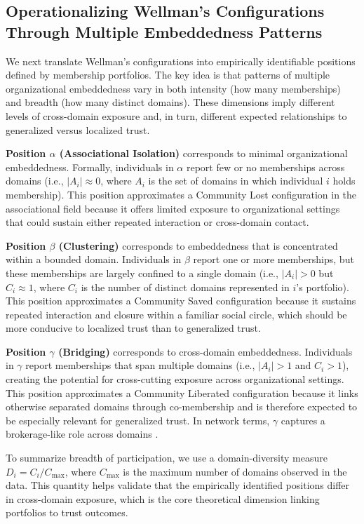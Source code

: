 \subsection{Operationalizing Wellman's Configurations Through Multiple Embeddedness Patterns}

We next translate Wellman's configurations into empirically identifiable positions defined by membership portfolios. The key idea is that patterns of multiple organizational embeddedness vary in both intensity (how many memberships) and breadth (how many distinct domains). These dimensions imply different levels of cross-domain exposure and, in turn, different expected relationships to generalized versus localized trust.

\textbf{Position $\alpha$ (Associational Isolation)} corresponds to minimal organizational embeddedness. Formally, individuals in $\alpha$ report few or no memberships across domains (i.e., $|A_i|\approx 0$, where $A_i$ is the set of domains in which individual $i$ holds membership). This position approximates a Community Lost configuration in the associational field because it offers limited exposure to organizational settings that could sustain either repeated interaction or cross-domain contact.

\textbf{Position $\beta$ (Clustering)} corresponds to embeddedness that is concentrated within a bounded domain. Individuals in $\beta$ report one or more memberships, but these memberships are largely confined to a single domain (i.e., $|A_i|>0$ but $C_i\approx 1$, where $C_i$ is the number of distinct domains represented in $i$'s portfolio). This position approximates a Community Saved configuration because it sustains repeated interaction and closure within a familiar social circle, which should be more conducive to localized trust than to generalized trust.

\textbf{Position $\gamma$ (Bridging)} corresponds to cross-domain embeddedness. Individuals in $\gamma$ report memberships that span multiple domains (i.e., $|A_i|>1$ and $C_i>1$), creating the potential for cross-cutting exposure across organizational settings. This position approximates a Community Liberated configuration because it links otherwise separated domains through co-membership and is therefore expected to be especially relevant for generalized trust. In network terms, $\gamma$ captures a brokerage-like role across domains \parencite{burt_brokerage_2005}.

To summarize breadth of participation, we use a domain-diversity measure $D_i = C_i/C_{\max}$, where $C_{\max}$ is the maximum number of domains observed in the data. This quantity helps validate that the empirically identified positions differ in cross-domain exposure, which is the core theoretical dimension linking portfolios to trust outcomes.






